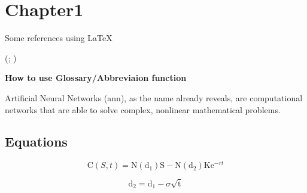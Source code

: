 \section{Chapter1}
	\label{sec:chapter1}

	Some references using \LaTeX

	\citet{de1998little}

	\citet[p.~34]{de1998little}

	\citep{de1998little}

	\citep[p.~34]{de1998little}

	\citep{de1998little,bieger2013}

	(\citealp[p.~3]{de1998little}; \citealp[p.~5]{bieger2013})

	\citep[e.g.][p.~34]{de1998little}

	\textbf{How to use Glossary/Abbreviaion function}

Artificial Neural Networks (\gls{ann}), as the name already reveals, are computational networks that are able to solve complex, nonlinear mathematical problems.

\lipsum[4]

\subsection{Equations}
	\label{subsec:equ}


	\begin{equation}
	\mathrm C( S, t)= \mathrm N(\mathrm d_1)\mathrm S - \mathrm N(\mathrm d_2) \mathrm K \mathrm e^{-rt}
	\label{eq:1}
	\end{equation}

	\begin{equation}
	\mathrm d_2= \mathrm d_1 - \sigma \sqrt{\mathrm t}
	\label{eq:3}
	\end{equation}

	\newpage
